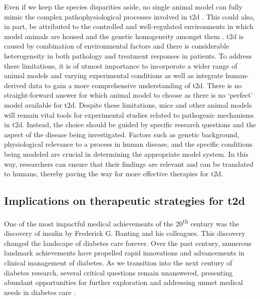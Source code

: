 \par Even if we keep the species disparities aside, no single animal model can fully mimic the complex pathophysiological processes involved in \gls{t2d} \textbf{\cite{singh_animal_2024}}. This could also, in part, be attributed to the controlled and well-regulated environments in which model animals are housed and the genetic homogeneity amongst them \textbf{\cite{bolker_animal_2017}}. \gls{t2d} is caused by combination of environmental factors and there is considerable heterogeneity in both pathology and treatment responses in patients. To address these limitations, it is of utmost importance to incorporate a wider range of animal models and varying experimental conditions as well as integrate human-derived data to gain a more comprehensive understanding of \gls{t2d}. There is no straight-forward answer for which animal model to choose as there is no `perfect' model available for \gls{t2d}. Despite these limitations, mice and other animal models will remain vital tools for experimental studies related to pathogenic mechanisms in \gls{t2d}. Instead, the choice should be guided by specific research questions and the aspect of the disease being investigated. Factors such as genetic background, physiological relevance to a process in human disease, and the specific conditions being modeled are crucial in determining the appropriate model system. In this way, researchers can ensure that their findings are relevant and can be translated to humans, thereby paving the way for more effective therapies for \gls{t2d}.

\subsection[Implications on therapeutic strategies for \glsentryshort{t2d}]{Implications on therapeutic strategies for \gls{t2d}}

\par One of the most impactful medical achievements of the 20\textsuperscript{th} century was the discovery of insulin by Frederick G. Banting and his colleagues. This discovery changed the landscape of diabetes care forever. Over the past century, numerous landmark achievements have propelled rapid innovations and advancements in clinical management of diabetes. As we transition into the next century of diabetes research, several critical questions remain unanswered, presenting abundant opportunities for further exploration and addressing unmet medical needs in diabetes care \textbf{\cite{cefalu_heterogeneity_2021}}. \\    

